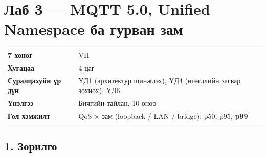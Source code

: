 \chapter{Лаб 3 — MQTT 5.0, Unified Namespace ба гурван зам}

\begingroup\scriptsize\begin{longtable}[]{@{}ll@{}}
\toprule
\endhead
\begin{minipage}[t]{0.47\columnwidth}\raggedright
\textbf{7 хоног}\strut
\end{minipage} & \begin{minipage}[t]{0.47\columnwidth}\raggedright
VII\strut
\end{minipage}\tabularnewline
\begin{minipage}[t]{0.47\columnwidth}\raggedright
\textbf{Хугацаа}\strut
\end{minipage} & \begin{minipage}[t]{0.47\columnwidth}\raggedright
4 цаг\strut
\end{minipage}\tabularnewline
\begin{minipage}[t]{0.47\columnwidth}\raggedright
\textbf{Суралцахуйн үр дүн}\strut
\end{minipage} & \begin{minipage}[t]{0.47\columnwidth}\raggedright
ҮД1 (архитектур шинжлэх), ҮД4 (өгөгдлийн загвар зохиох), ҮД6\strut
\end{minipage}\tabularnewline
\begin{minipage}[t]{0.47\columnwidth}\raggedright
\textbf{Үнэлгээ}\strut
\end{minipage} & \begin{minipage}[t]{0.47\columnwidth}\raggedright
Бичгийн тайлан, 10 оноо\strut
\end{minipage}\tabularnewline
\begin{minipage}[t]{0.47\columnwidth}\raggedright
\textbf{Гол хэмжилт}\strut
\end{minipage} & \begin{minipage}[t]{0.47\columnwidth}\raggedright
QoS × зам (loopback / LAN / bridge): p50, p95, \textbf{p99}\strut
\end{minipage}\tabularnewline
\bottomrule
\end{longtable}\endgroup

\hypertarget{ux437ux43eux440ux438ux43bux433ux43e}{%
\section{1. Зорилго}\label{ux437ux43eux440ux438ux43bux433ux43e}}

